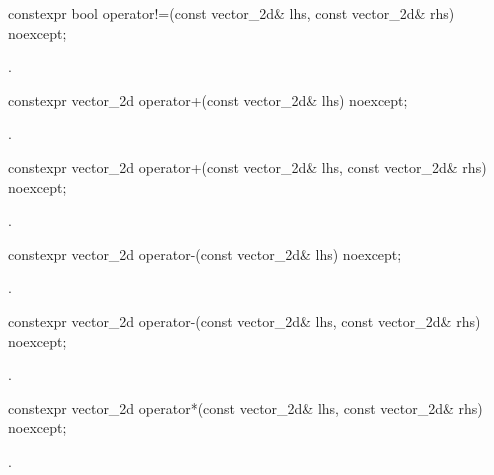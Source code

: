 %
\begin{itemdecl}
constexpr bool operator!=(const vector_2d& lhs, const vector_2d& rhs) noexcept;
\end{itemdecl}
\begin{itemdescr}
\pnum
\returns
{}.
\end{itemdescr}

%
\begin{itemdecl}
constexpr vector_2d operator+(const vector_2d& lhs) noexcept;
\end{itemdecl}
\begin{itemdescr}
\pnum
\returns
{}.
\end{itemdescr}

%
\begin{itemdecl}
constexpr vector_2d operator+(const vector_2d& lhs, const vector_2d& rhs) 
  noexcept;
\end{itemdecl}
\begin{itemdescr}
\pnum
\returns
{}.
\end{itemdescr}

%
\begin{itemdecl}
constexpr vector_2d operator-(const vector_2d& lhs) noexcept;
\end{itemdecl}
\begin{itemdescr}
\pnum
\returns
{}.
\end{itemdescr}

%
\begin{itemdecl}
constexpr vector_2d operator-(const vector_2d& lhs, const vector_2d& rhs) 
  noexcept;
\end{itemdecl}
\begin{itemdescr}
\pnum
\returns
{}.
\end{itemdescr}

%
\begin{itemdecl}
constexpr vector_2d operator*(const vector_2d& lhs, const vector_2d& rhs) 
  noexcept;
\end{itemdecl}
\begin{itemdescr}
\pnum
\returns
{}.
\end{itemdescr}

